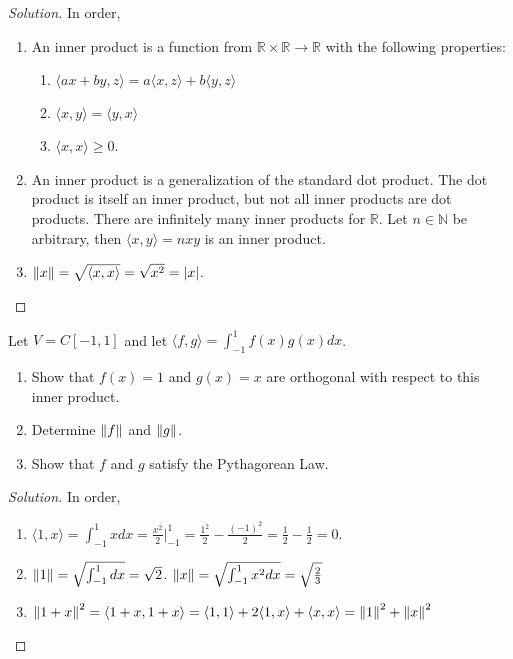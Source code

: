 \documentclass[../main.tex]{subfiles}
\begin{document}
\begin{proof}[Solution]
In order,
\begin{enumerate}
\item An inner product is a function from $\mathbb{R}\times \mathbb{R}\rightarrow \mathbb{R}$ with the following properties:
\begin{enumerate}
\item $\langle ax+by,z\rangle = a\langle x,z\rangle+b\langle y,z\rangle$
\item $\langle x,y\rangle = \langle y,x \rangle$
\item $\langle x,x\rangle \geq 0$.
\end{enumerate}
\item An inner product is a generalization of the standard dot product. The dot product is itself an inner product, but not all inner products are dot products. There are infinitely many inner products for $\mathbb{R}$. Let $n\in \mathbb{N}$ be arbitrary, then $\langle x,y \rangle = nxy$ is an inner product.
\item $\norm{x} = \sqrt{\langle x,x \rangle } = \sqrt{x^2}= |x|$.
\end{enumerate}
\end{proof}
%
\begin{problem}
Let $V = C[-1,1]$ and let $\langle f,g\rangle = \int_{-1}^{1} f(x)g(x)dx$.
\begin{enumerate}
\item Show that $f(x)=1$ and $g(x) = x$ are orthogonal with respect to this inner product.
\item Determine $\norm{f}$ and $\norm{g}$.
\item Show that $f$ and $g$ satisfy the Pythagorean Law.
\end{enumerate}
\end{problem}
\begin{proof}[Solution]
In order,
\begin{enumerate}
\item $\langle 1,x\rangle = \int_{-1}^{1} xdx = \frac{x^2}{2}\big|_{-1}^{1} = \frac{1^2}{2}-\frac{(-1)^2}{2} = \frac{1}{2}-\frac{1}{2} = 0$.
\item $\norm{1} = \sqrt{ \int_{-1}^{1} dx} = \sqrt{2}$. $\norm{x} = \sqrt{\int_{-1}^{1}x^2dx} = \sqrt{\frac{2}{3}}$
\item $\norm{1+x}^2 = \langle 1+x,1+x\rangle = \langle 1,1\rangle + 2\langle 1,x \rangle + \langle x,x\rangle = \norm{1}^2 + \norm{x}^2$
\end{enumerate}
\end{proof}
\end{document}
